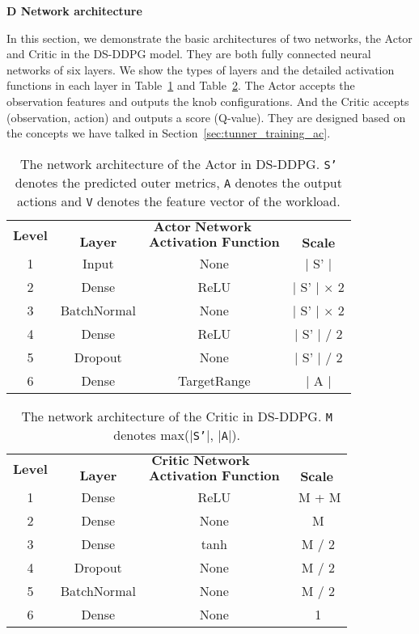 \vspace{2.5em}
\noindent \textbf{\large D Network architecture}
\label{sec:network}

In this section, we demonstrate the basic architectures of two networks, the Actor and Critic in the DS-DDPG model. They are both fully connected neural networks of six layers. We show the types of layers and the detailed activation functions in each layer in Table~\ref{tbl:actor} and Table~\ref{tbl:critic}. The Actor accepts the observation features and outputs the knob configurations. And the Critic accepts (observation, action) and outputs a score (Q-value). They are designed based on the concepts we have talked in Section~\ref{sec:tunner_training_ac}.




\begin{table}[H]
\caption{The network architecture of the Actor in DS-DDPG. \texttt{S'} denotes the predicted outer metrics, \texttt{A} denotes the output actions and \texttt{V} denotes the feature vector of the workload.}
\centering  
	\begin{tabular}{c|c|c|c}\hline
	\multirow{2}{*}{$\textbf{Level}$} & \multicolumn{3}{c}{$\textbf{Actor\ Network}$} \\
	& \multicolumn{1}{c|}{$\textbf{Layer}$} & $\textbf{Activation\ Function}$ & $\textbf{Scale}$\\ \hline
	1 & Input & None & $|$ S' $|$ \\
	2 & Dense & ReLU & $|$ S' $|$ $\times$ 2\\
	3 & BatchNormal & None & $|$ S' $|$ $\times$ 2\\
	4 & Dense & ReLU & $|$ S' $|$ / 2\\
	5 & Dropout & None & $|$ S' $|$ / 2\\
	6 & Dense & TargetRange & $|$ A $|$\\\hline
	\end{tabular} 
\label{tbl:actor}    
\end{table} 

\begin{table}[H]
\caption{The network architecture of the Critic in DS-DDPG. \texttt{M} denotes max($|$\texttt{S'}$|$, $|$\texttt{A}$|$).}
\centering  
	\begin{tabular}{c|c|c|c}\hline
	\multirow{2}{*}{$\textbf{Level}$} & \multicolumn{3}{c}{$\textbf{Critic\ Network}$} \\
	& \multicolumn{1}{c|}{$\textbf{Layer}$} & $\textbf{Activation\ Function}$ & $\textbf{Scale}$\\ \hline
	
	1 & Dense & ReLU & $\ \ $M + M\\
	2 & Dense & None & $\ $M\\
	3 & Dense & tanh & $\ $M / 2\\	
	4 & Dropout & None & $\ $M / 2\\
	5 & BatchNormal & None & $\ $M / 2\\
	6 & Dense & None & $\ $1\\\hline
  \end{tabular}

\label{tbl:critic}    
\end{table} 


